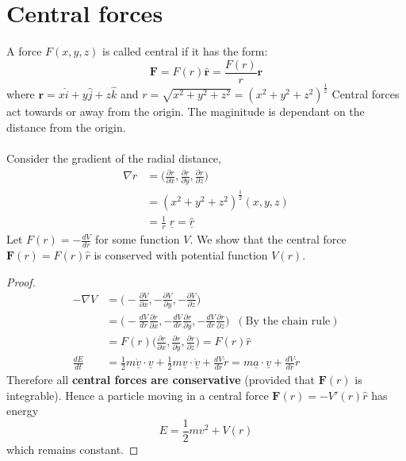 \section{Central forces}
A force \( F(x,y,z) \) is called central if it has the form:
\[ 
  \textbf{F} = F(r)\hat{ \textbf{r}} = \frac{F(r)}{r} \textbf{r}
\]
where \( \textbf{r} = x\hat{i} + y \hat{j} + z \hat{k} \) and \( r = \sqrt{x^2
+ y^2 + z^2} = (x^2 + y^2 + z^2)^{\frac{1}{2}}\)
Central forces act towards or away from the origin. The maginitude is dependant
on the distance from the origin.
\\\\
Consider the gradient of the radial distance,
\begin{align*} 
  \nabla r &= \Bigg ( \frac{\partial{r}}{\partial{x}},
  \frac{\partial{r}}{\partial{y}}, \frac{\partial{r}}{\partial{z}}\Bigg) \\
	   &= (x^2 + y^2 + z^2)^{\frac{1}{2}} (x,y,z)\\
	   &= \frac{1}{r} \; \underline{r} = \underline{ \hat{r}}
\end{align*}
Let \( F(r) = -\displaystyle \frac{dV}{dr} \) for some function \( V \). We
show that the central force \( \textbf{F}(r) = F(r) \hat{r} \) is conserved
with potential function \( V(r) \).
\begin{proof}

\begin{align*}
  - \nabla V  &= \Bigg(- \frac{\partial{V}}{\partial{x}},
  - \frac{\partial{V}}{\partial{y}}, - \frac{\partial{V}}{\partial{z}}\Bigg)\\
  &= \Bigg(- \frac{dV}{dr} \frac{\partial{r}}{\partial{x}}, - \frac{dV}{dr}
    \frac{\partial{r}}{\partial{y}}, - \frac{dV}{dr}
  \frac{\partial{r}}{\partial{z}}\Bigg) \;\; (\text{By the chain rule}) \\
  &= F(r) \Bigg( \frac{\partial{r}}{\partial{x}},
  \frac{\partial{r}}{\partial{y}}, \frac{\partial{r}}{\partial{z}}\Bigg)
  = F(r) \hat{r}\\
  \frac{dE}{dt} &= \frac{1}{2}m \underline{ \dot{v}} \cdot \underline{v}
+ \frac{1}{2} m \underline{v} \cdot \underline{ \dot{v}} + \frac{dV}{dr}
\dot{r} = m \underline{a} \cdot \underline{v} + \frac{dV}{dr} \dot{r} 
\end{align*}
Therefore all \textbf{central forces are conservative} (provided that \(
\textbf{F}(r) \) is integrable). Hence a particle moving in a central force \(
\textbf{F}(r) = -V'(r) \hat{r}\) has energy
\[ 
  E = \frac{1}{2} mv^2 + V(r)
\]
which remains constant.
\end{proof}
